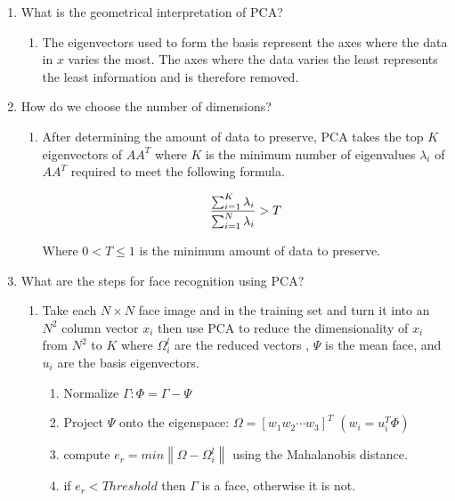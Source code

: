 \begin{enumerate}
  \item What is the geometrical interpretation of PCA?

  \begin{enumerate}
    \item The eigenvectors used to form the basis represent the axes where the data in $x$ varies the most.
          The axes where the data varies the least represents the least information and is therefore removed.
  \end{enumerate}

  \item How do we choose the number of dimensions?

  \begin{enumerate}
    \item After determining the amount of data to preserve, PCA takes the top $K$
          eigenvectors of $AA^T$ where $K$ is the minimum number of eigenvalues $\lambda_i$
          of $AA^T$ required to meet the following formula.

          \[
            {\sum_{i=1}^K \lambda_i \over \sum_{i=1}^N \lambda_i} > T
          \]

          Where $0 < T \leq 1$ is the minimum amount of data to preserve.
  \end{enumerate}

  \item What are the steps for face recognition using PCA?

  \begin{enumerate}
    \item Take each $N \times N$ face image and in the training set and turn it into an $N^2$ column vector $x_i$ then use PCA to reduce the
          dimensionality of $x_i$ from $N^2$ to $K$ where $\Omega_i^l$ are the reduced vectors
          , $\Psi$ is the mean face, and $u_i$ are the basis eigenvectors.
    \begin{enumerate}
      \item Normalize $\Gamma: \Phi = \Gamma - \Psi$
      \item Project $\Psi$ onto the eigenspace: $\Omega = [w_1 w_2 \cdots w_3]^T$ \hspace{15pt} $(w_i = u_i^T \Phi)$
      \item compute $e_r = min\left \| \Omega - \Omega_i^l \right \|$ using the Mahalanobis distance.
      \item if $e_r < Threshold$ then $\Gamma$ is a face, otherwise it is not.
    \end{enumerate}
  \end{enumerate}

\end{enumerate}

